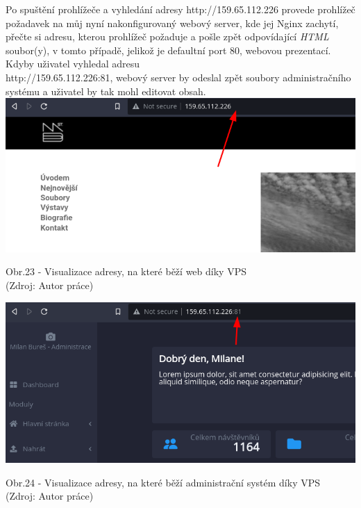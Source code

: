 \documentclass[12pt,a4paper]{report}
\begin{document}
  Po spuštění prohlížeče a vyhledání adresy http://159.65.112.226 provede prohlížeč
  požadavek na můj nyní nakonfigurovaný webový server, kde jej Nginx zachytí, přečte si adresu, kterou prohlížeč požaduje a 
  pošle zpět odpovídající \emph{HTML} soubor(y), v tomto případě, jelikož je defaultní port 80, webovou prezentací.
  Kdyby uživatel vyhledal adresu \\ http://159.65.112.226:81, webový server by odeslal zpět soubory administračního systému a uživatel by tak mohl editovat 
  obsah.
  \vfill
  \vspace*{0.5cm}
  \noindent\includegraphics[width=\linewidth]{VPS_WEB.png}
  \begin{center}
    Obr.23 - Visualizace adresy, na které běží web díky VPS \\
    (Zdroj: Autor práce)
  \end{center}
  \vspace*{0.5cm}
  \vspace*{0.5cm}
  \noindent\includegraphics[width=\linewidth]{VPS_CMS.png}
  \begin{center}
    Obr.24 - Visualizace adresy, na které běží administrační systém díky VPS \\
    (Zdroj: Autor práce)
  \end{center}
  \vspace*{0.5cm}
\end{document}
